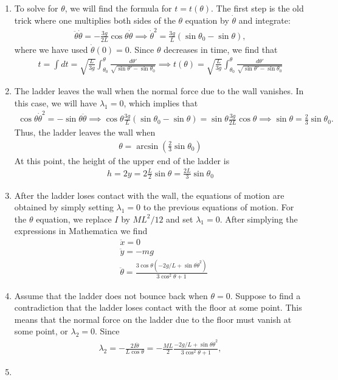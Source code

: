 \documentclass{article}
\theoremstyle{definition}
\newcommand{\f}[2]{\frac{#1}{#2}}
\newcommand{\lp}{\left(}
\newcommand{\rp}{\right)}
\begin{document}
\begin{enumerate}[label = (\alph*)]
		\item To solve for $\theta$, we will find the formula for $t=t(\theta)$. The first step is the old trick where one multiplies both sides of the $\theta$ equation by $\dot\theta$ and integrate: 
		\begin{align*}
		\ddot\theta \dot \theta = -\f{3g}{2L}\cos\theta \dot\theta \implies \dot\theta^2 = \f{3g}{L}(\sin\theta_0-\sin\theta),
		\end{align*}
		where we have used $\dot\theta(0) = 0$. Since $\theta$ decreases in time, we find that
		\begin{align*}
		t = \int dt = \sqrt{\f{L}{3g}}\int_{\theta_0}^{\theta} \f{d\theta'}{\sqrt{\sin\theta'-\sin\theta_0}} \implies \boxed{t(\theta) = \sqrt{\f{L}{3g}}\int_{\theta_0}^{\theta} \f{d\theta'}{\sqrt{\sin\theta'-\sin\theta_0}}}
		\end{align*}
		
		\item The ladder leaves the wall when the normal force due to the wall vanishes. In this case, we will have $\lambda_1 = 0$, which implies that
		\begin{align*}
		\cos\theta \dot\theta^2 = -\sin\theta\ddot\theta \implies \cos\theta \f{3g}{L}(\sin\theta_0-\sin\theta) = \sin\theta \f{3g}{2L}\cos\theta \implies \sin\theta = \f{2}{3}\sin\theta_0.
		\end{align*}
		Thus, the ladder leaves the wall when 
		\begin{align*}
		\boxed{\theta = \arcsin\lp \f{2}{3}\sin\theta_0 \rp}
		\end{align*}
		At this point, the height of the upper end of the ladder is 
		\begin{align*}
		h = 2y = 2\f{L}{2} \sin\theta = \boxed{\f{2L}{3}\sin\theta_0}
		\end{align*}
		
		\item After the ladder loses contact with the wall, the equations of motion are obtained by simply setting $\lambda_1 =0$ to the previous equations of motion. For the $\theta$ equation, we replace $I$ by $ML^2/12$ and set $\lambda_1 = 0$. After simplying the expressions in Mathematica we find 
		\begin{align*}
		&\boxed{\ddot{x} = 0}\\
		&\boxed{\ddot{y} = -mg }\\
		&\boxed{\ddot\theta= \frac{3\cos \theta \left(-2g/L + \sin\theta \dot\theta^2\right)}{ 3\cos^2\theta+1}}
		\end{align*}
		
		
		\item Assume that the ladder does not bounce back when $\theta = 0$. Suppose to find a contradiction that the ladder loses contact with the floor at some point. This means that the normal force on the ladder due to the floor must vanish at some point, or $\lambda_2 = 0$. Since 
		\begin{align*}
		\lambda_2 = -\f{2I\ddot\theta}{L\cos\theta} = -\f{ML}{2}\f{-2g/L + \sin\theta \dot\theta^2}{3\cos^2\theta+1},
		\end{align*} 
		\item  
	\end{enumerate} 
	
	
	
\end{document}
